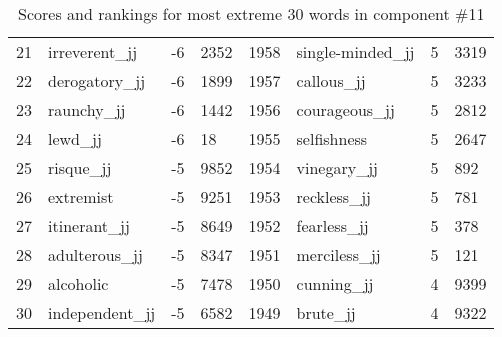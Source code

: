 \begin{table}[tbp]
\begin{tabular}{| rlr@{.}l | rlr@{.}l |}
    21 & irreverent\_jj & -6 & 2352    &    1958 & single-minded\_jj & 5 & 3319 \\
    22 & derogatory\_jj & -6 & 1899    &    1957 & callous\_jj & 5 & 3233 \\
    23 & raunchy\_jj & -6 & 1442    &    1956 & courageous\_jj & 5 & 2812 \\
    24 & lewd\_jj & -6 & 18    &    1955 & selfishness & 5 & 2647 \\
    25 & risque\_jj & -5 & 9852    &    1954 & vinegary\_jj & 5 & 892 \\
    26 & extremist & -5 & 9251    &    1953 & reckless\_jj & 5 & 781 \\
    27 & itinerant\_jj & -5 & 8649    &    1952 & fearless\_jj & 5 & 378 \\
    28 & adulterous\_jj & -5 & 8347    &    1951 & merciless\_jj & 5 & 121 \\
    29 & alcoholic & -5 & 7478    &    1950 & cunning\_jj & 4 & 9399 \\
    30 & independent\_jj & -5 & 6582    &    1949 & brute\_jj & 4 & 9322 \\
    \hline
    \end{tabular}
    \caption{Scores and rankings for most extreme 30 words in component \#11} 
\end{table}
\clearpage
